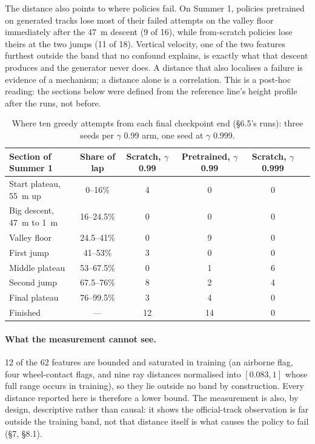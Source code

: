 \documentclass[11pt]{article}
\begin{document}
The distance also points to where policies fail. On Summer 1, policies pretrained on generated tracks lose most of their failed attempts on the valley floor immediately after the 47~m descent (9 of 16), while from-scratch policies lose theirs at the two jumps (11 of 18). Vertical velocity, one of the two features furthest outside the band that no confound explains, is exactly what that descent produces and the generator never does. A distance that also localises a failure is evidence of a mechanism; a distance alone is a correlation. This is a post-hoc reading: the sections below were defined from the reference line's height profile after the runs, not before.

\begin{table}[h]
\centering
\small
\begin{tabular}{@{}L{4cm}ccccc@{}}
\toprule
\textbf{Section of Summer 1} & \textbf{Share of lap} & \textbf{Scratch, $\gamma$ 0.99} & \textbf{Pretrained, $\gamma$ 0.99} & \textbf{Scratch, $\gamma$ 0.999} \\
\midrule
Start plateau, 55~m up & 0--16\% & 4 & 0 & 0 \\
Big descent, 47~m to 1~m & 16--24.5\% & 0 & 0 & 0 \\
Valley floor & 24.5--41\% & 0 & 9 & 0 \\
First jump & 41--53\% & 3 & 0 & 0 \\
Middle plateau & 53--67.5\% & 0 & 1 & 6 \\
Second jump & 67.5--76\% & 8 & 2 & 4 \\
Final plateau & 76--99.5\% & 3 & 4 & 0 \\
\midrule
Finished & --- & 12 & 14 & 0 \\
\bottomrule
\end{tabular}
\caption{Where ten greedy attempts from each final checkpoint end (\S6.5's runs): three seeds per $\gamma$ 0.99 arm, one seed at $\gamma$ 0.999.}
\label{tab:sectionsplit}
\end{table}

\paragraph{What the measurement cannot see.} 12 of the 62 features are bounded and saturated in training (an airborne flag, four wheel-contact flags, and nine ray distances normalised into $[0.083, 1]$ whose full range occurs in training), so they lie outside no band by construction. Every distance reported here is therefore a lower bound. The measurement is also, by design, descriptive rather than causal: it shows the official-track observation is far outside the training band, not that distance itself is what causes the policy to fail (\S7, \S8.1).
\end{document}
